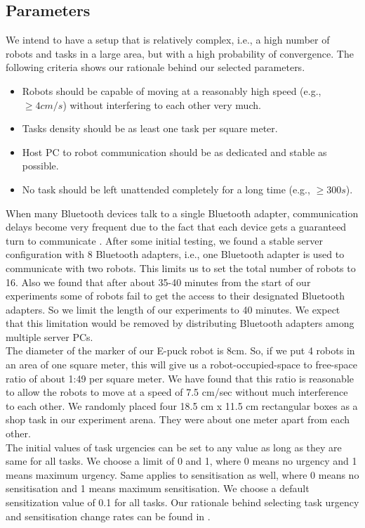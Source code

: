 \documentclass[letterpaper, 10 pt, times, conference]{ieeeconf} %
\begin{document}
\subsection{Parameters}
We intend to have a setup that is relatively complex, i.e., a high number of robots and tasks in a large area, but with a high probability of convergence. The following criteria shows our rationale behind our selected parameters.
%
\begin{itemize}
\item Robots should be capable of moving at a reasonably high speed (e.g., $\geq 4 cm/s$) without interfering to each other very much.
\item Tasks density should be as least one task per square meter.
\item Host PC to robot communication should be as dedicated and stable as possible.
\item No task should be left unattended completely for a long time (e.g., $\geq 300s $).
\end{itemize}
%
When many Bluetooth devices talk to a single Bluetooth adapter, communication delays become very frequent due to the fact that each device gets a guaranteed turn to communicate \cite{Bluetooth}. After some initial testing, we found a stable server configuration with 8 Bluetooth adapters, i.e., one Bluetooth adapter is used to communicate with two robots. This limits us to set the total number of robots to 16. Also we found that after about 35-40 minutes from the start of our experiments some of robots fail to get the access to their designated Bluetooth adapters. So we limit the length of our experiments to 40 minutes. We expect that this limitation would be removed by distributing Bluetooth adapters among multiple server PCs.\\ 
The diameter of the marker of our E-puck robot is 8cm. So, if we put 4 robots in an area of one square meter, this will give us a robot-occupied-space to free-space ratio of about 1:49 per square meter. We have found that this ratio is reasonable to allow the robots to move at a speed of 7.5 cm/sec without much interference to each other. We randomly placed four 18.5 cm x 11.5 cm rectangular boxes as a shop task in our experiment arena. They were about one meter apart from each other.\\
The initial values of task urgencies can be set to any value as long as they are same for all tasks. We choose a limit of 0 and 1, where 0 means no urgency and 1 means maximum urgency. Same applies to sensitisation as well, where 0 means no sensitisation and 1 means maximum sensitisation. We choose a default sensitization value of 0.1 for all tasks. Our rationale behind selecting task urgency and sensitisation change rates can be found in \cite{Sarker}.
\end{document}
